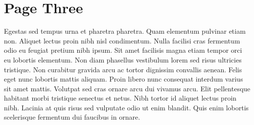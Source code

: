 \chapter{Page Three}

Egestas sed tempus urna et pharetra pharetra. Quam elementum pulvinar etiam non. Aliquet lectus proin nibh nisl condimentum. Nulla facilisi cras fermentum odio eu feugiat pretium nibh ipsum. Sit amet facilisis magna etiam tempor orci eu lobortis elementum. Non diam phasellus vestibulum lorem sed risus ultricies tristique. Non curabitur gravida arcu ac tortor dignissim convallis aenean. Felis eget nunc lobortis mattis aliquam. Proin libero nunc consequat interdum varius sit amet mattis. Volutpat sed cras ornare arcu dui vivamus arcu. Elit pellentesque habitant morbi tristique senectus et netus. Nibh tortor id aliquet lectus proin nibh. Lacinia at quis risus sed vulputate odio ut enim blandit. Quis enim lobortis scelerisque fermentum dui faucibus in ornare.